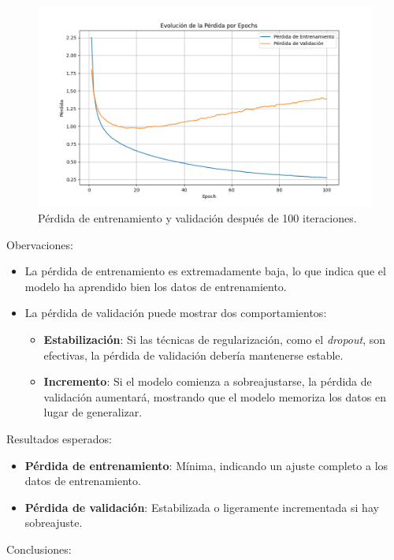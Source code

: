 \documentclass{article}
\begin{document}
\newpage

\begin{figure}[H]
    \centering
    \includegraphics[scale=0.4]{100.png}
    \caption{Pérdida de entrenamiento y validación después de 100 iteraciones.}
\end{figure}

{\large{Obervaciones}}:
\begin{itemize}
    \item La pérdida de entrenamiento es extremadamente baja, lo que indica que el modelo ha aprendido bien los datos de entrenamiento.
    \item La pérdida de validación puede mostrar dos comportamientos:
    \begin{itemize}
        \item \textbf{Estabilización}: Si las técnicas de regularización, como el \textit{dropout}, son efectivas, la pérdida de validación debería mantenerse estable.
        \item \textbf{Incremento}: Si el modelo comienza a sobreajustarse, la pérdida de validación aumentará, mostrando que el modelo memoriza los datos en lugar de generalizar.
    \end{itemize}
\end{itemize}

{\large{Resultados esperados}}:
\begin{itemize}
    \item \textbf{Pérdida de entrenamiento}: Mínima, indicando un ajuste completo a los datos de entrenamiento.
    \item \textbf{Pérdida de validación}: Estabilizada o ligeramente incrementada si hay sobreajuste.
\end{itemize}

{\large{Conclusiones}}: \\
\end{document}
